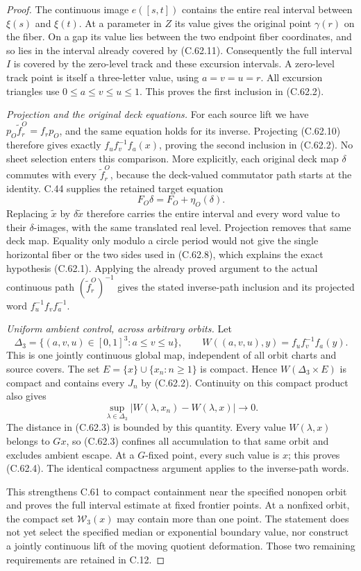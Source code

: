 \begin{proof}
The continuous image $e([s,t])$ contains the
entire real interval between $\xi(s)$ and
$\xi(t)$. At a parameter in $Z$ its value gives
the original point $\gamma(r)$ on the fiber.
On a gap its value lies between the two endpoint
fiber coordinates, and so lies in the interval
already covered by (C.62.11). Consequently the
full interval $I$ is covered by the zero-level
track and these excursion intervals.
A zero-level track point is itself a three-letter
value, using $a=v=u=r$. All excursion triangles
use $0\leq a\leq v\leq u\leq1$.
This proves the first inclusion in (C.62.2).

\emph{Projection and the original deck equations.}
For each source lift we have
$p_O\widetilde f_r^O=f_rp_O$, and the same
equation holds for its inverse. Projecting
(C.62.10) therefore gives exactly
$f_u f_v^{-1}f_a(x)$, proving the second
inclusion in (C.62.2).
No sheet selection enters this comparison.
More explicitly, each original deck map $\delta$
commutes with every $\widetilde f_r^O$, because
the deck-valued commutator path starts at the
identity. C.44 supplies the retained target
equation
\[
                   F_O\delta=F_O+\eta_O(\delta).
                                                               \tag{C.62.12}
\]
Replacing $\widetilde x$ by $\delta\widetilde x$
therefore carries the entire interval and every
word value to their $\delta$-images, with the
same translated real level. Projection removes
that same deck map. Equality only modulo a
circle period would not give the single
horizontal fiber or the two sides used in
(C.62.8), which explains the exact hypothesis
(C.62.1).
Applying the already proved argument to the
actual continuous path $(\widetilde f_r^O)^{-1}$
gives the stated inverse-path inclusion and its
projected word $f_u^{-1}f_vf_a^{-1}$.

\emph{Uniform ambient control, across arbitrary orbits.}
Let
\[
 \Delta_3=\{(a,v,u)\in[0,1]^3:a\leq v\leq u\},\qquad
 W((a,v,u),y)=f_u f_v^{-1}f_a(y).
                                                               \tag{C.62.13}
\]
This is one jointly continuous global map,
independent of all orbit charts and source covers.
The set $E=\{x\}\cup\{x_n:n\geq1\}$ is compact.
Hence $W(\Delta_3\times E)$ is compact and
contains every $J_n$ by (C.62.2).
Continuity on this compact product also gives
\[
 \sup_{\lambda\in\Delta_3}
      |W(\lambda,x_n)-W(\lambda,x)|\longrightarrow0.
                                                               \tag{C.62.14}
\]
The distance in (C.62.3) is bounded by this
quantity. Every value $W(\lambda,x)$ belongs
to $Gx$, so (C.62.3) confines all accumulation
to that same orbit and excludes ambient escape.
At a $G$-fixed point, every such value is $x$;
this proves (C.62.4). The identical compactness
argument applies to the inverse-path words.

This strengthens C.61 to compact containment
near the specified nonopen orbit and proves
the full interval estimate at fixed frontier
points. At a nonfixed orbit, the compact set
$\mathcal W_3(x)$ may contain more than one
point. The statement does not yet select the
specified median or exponential boundary
value, nor construct a jointly continuous
lift of the moving quotient deformation.
Those two remaining requirements are retained
in C.12.
\end{proof}
